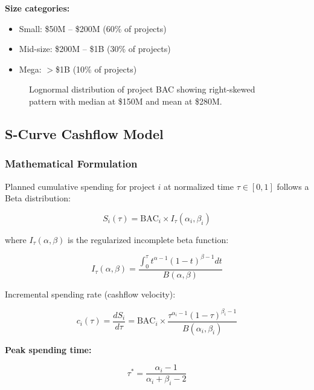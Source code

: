 \textbf{Size categories:}
\begin{itemize}
    \item Small: \$50M -- \$200M (60\% of projects)
    \item Mid-size: \$200M -- \$1B (30\% of projects)
    \item Mega: $>$\$1B (10\% of projects)
\end{itemize}

\begin{figure}[h]
\centering
\resizebox{0.9\columnwidth}{!}{}
\caption{Lognormal distribution of project BAC showing right-skewed pattern with median at \$150M and mean at \$280M.}
\label{fig:bac_distribution}
\end{figure}

\subsection{S-Curve Cashflow Model}

\subsubsection{Mathematical Formulation}

Planned cumulative spending for project $i$ at normalized time $\tau \in [0,1]$ follows a Beta distribution:

\begin{equation}
S_i(\tau) = \text{BAC}_i \times I_\tau(\alpha_i, \beta_i)
\end{equation}

where $I_\tau(\alpha, \beta)$ is the regularized incomplete beta function:

\begin{equation}
I_\tau(\alpha, \beta) = \frac{\int_0^\tau t^{\alpha-1}(1-t)^{\beta-1} dt}{B(\alpha, \beta)}
\end{equation}

Incremental spending rate (cashflow velocity):

\begin{equation}
c_i(\tau) = \frac{dS_i}{d\tau} = \text{BAC}_i \times \frac{\tau^{\alpha_i-1}(1-\tau)^{\beta_i-1}}{B(\alpha_i, \beta_i)}
\end{equation}

\textbf{Peak spending time:}

\begin{equation}
\tau^* = \frac{\alpha_i - 1}{\alpha_i + \beta_i - 2}
\end{equation}

